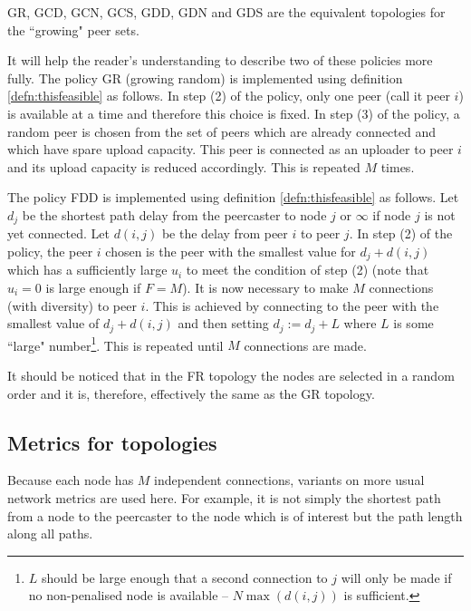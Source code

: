 GR, GCD, GCN, GCS, GDD, GDN and GDS are the equivalent topologies for the
``growing" peer sets.

It will help the reader's understanding to describe two of these policies more fully.
The policy GR (growing random) is implemented using definition \ref{defn:thisfeasible}
as follows.  In step (2) of the policy, only one peer (call it peer $i$) 
is available at a time
and therefore this choice is fixed.  In step (3) of the policy, a random peer is
chosen from the set of peers which are already connected and which have spare
upload capacity.  This peer is connected as an uploader to peer $i$ and its upload
capacity is reduced accordingly.  This is repeated $M$ times.

The policy FDD is implemented using definition \ref{defn:thisfeasible} as follows.
Let $d_j$ be the shortest path delay from the peercaster
to node $j$ or $\infty$ if node $j$ is not
yet connected.  Let $d(i,j)$ be the delay from peer $i$ to peer $j$.
In step (2) of the policy, the peer $i$ chosen is the peer with the
smallest value for $d_j + d(i,j)$ which has a sufficiently large $u_i$ to meet the
condition of step (2) (note that $u_i = 0$ is large enough if $F = M$).  It is now
necessary to make $M$ connections (with diversity) to peer $i$.  This is achieved
by connecting to the peer with the smallest value of $d_j + d(i,j)$ and then setting
$d_j:= d_j + L$ where $L$ is some ``large" number\footnote{$L$ should be large
enough that a second connection to $j$ will only be made if no non-penalised node is
available -- $N \max(d(i,j))$ is sufficient.}.  This is repeated until $M$ connections
are made.

\begin{remark}
It should be noticed that in the FR topology the nodes are selected in 
a random order and it is, therefore, effectively the same as the GR topology.
\end{remark}

\subsection{Metrics for topologies}

Because each node has $M$ independent connections, variants on more 
usual network metrics are used here.  For example, it is not 
simply the shortest path
from a node to the peercaster to the node which is of interest but the 
path length along all paths.

